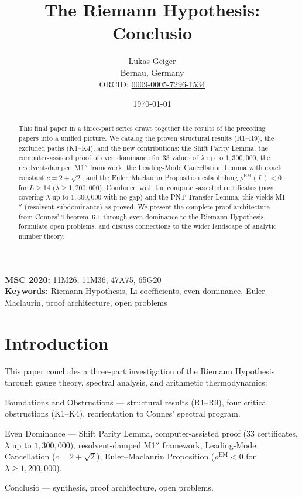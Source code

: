 \documentclass[12pt,a4paper]{article}
\title{The Riemann Hypothesis: Conclusio}
\author{Lukas Geiger\\
\small Bernau, Germany\\
\small ORCID: \href{https://orcid.org/0009-0005-7296-1534}{0009-0005-7296-1534}}
\date{\today}
\theoremstyle{definition}
\theoremstyle{remark}
\begin{document}
\overfullrule=0pt
\maketitle

\begin{abstract}
This final paper in a three-part series draws together the results of the preceding papers into a unified picture. We catalog the proven structural results (R1--R9), the excluded paths (K1--K4), and the new contributions: the Shift Parity Lemma, the computer-assisted proof of even dominance for $33$ values of $\lambda$ up to $1{,}300{,}000$, the resolvent-damped M1$''$ framework, the Leading-Mode Cancellation Lemma with exact constant $c = 2 + \sqrt{2}$, and the Euler--Maclaurin Proposition establishing $\rho^{\mathrm{EM}}(L) < 0$ for $L \geq 14$ ($\lambda \geq 1{,}200{,}000$). Combined with the computer-assisted certificates (now covering $\lambda$ up to $1{,}300{,}000$ with no gap) and the PNT Transfer Lemma, this yields M1$''$ (resolvent subdominance) as proved. We present the complete proof architecture from Connes' Theorem~6.1 through even dominance to the Riemann Hypothesis, formulate open problems, and discuss connections to the wider landscape of analytic number theory.
\end{abstract}

\noindent\textbf{MSC 2020:} 11M26, 11M36, 47A75, 65G20\\
\textbf{Keywords:} Riemann Hypothesis, Li coefficients, even dominance, Euler--Maclaurin, proof architecture, open problems

\newpage
\tableofcontents

\newpage

\section{Introduction}
\label{sec:intro}

This paper concludes a three-part investigation of the Riemann Hypothesis through gauge theory, spectral analysis, and arithmetic thermodynamics:
\begin{description}[font=\bfseries,leftmargin=2em]
  \item[Part~I \cite{Geiger2026partI}:] Foundations and Obstructions --- structural results (R1--R9), four critical obstructions (K1--K4), reorientation to Connes' spectral program.
  \item[Part~II \cite{Geiger2026partII}:] Even Dominance --- Shift Parity Lemma, computer-assisted proof ($33$ certificates, $\lambda$ up to $1{,}300{,}000$), resolvent-damped M1$''$ framework, Leading-Mode Cancellation ($c = 2 + \sqrt{2}$), Euler--Maclaurin Proposition ($\rho^{\mathrm{EM}} < 0$ for $\lambda \geq 1{,}200{,}000$).
  \item[Part~III (this paper):] Conclusio --- synthesis, proof architecture, open problems.
\end{description}
\end{document}

